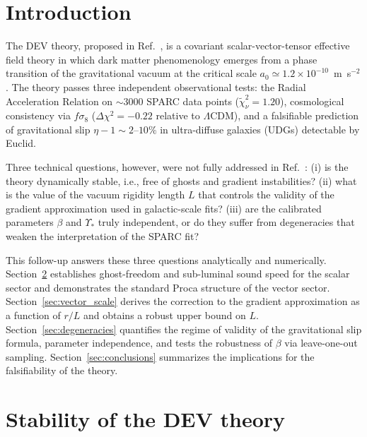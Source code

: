 \documentclass[aps,prd,reprint,floatfix,nofootinbib,superscriptaddress]{revtex4-2}
\newcommand{\aO}{a_0}
\begin{document}
\section{Introduction}

The DEV theory, proposed in Ref.~\cite{Mendes2026}, is a covariant
scalar-vector-tensor effective field theory in which dark matter
phenomenology emerges from a phase transition of the gravitational
vacuum at the critical scale $\aO\simeq 1.2\times10^{-10}$~m~s$^{-2}$.
The theory passes three independent observational tests:
the Radial Acceleration Relation on $\sim$3000 SPARC data points
($\widetilde{\chi}^2_\nu=1.20$), cosmological consistency via
$f\sigma_8$ ($\Delta\chi^2 = -0.22$ relative to $\Lambda$CDM), and a
falsifiable prediction of gravitational slip $\eta-1\sim 2\text{--}10\%$
in ultra-diffuse galaxies (UDGs) detectable by Euclid.

Three technical questions, however, were not fully addressed in
Ref.~\cite{Mendes2026}: (i) is the theory dynamically stable, i.e.,
free of ghosts and gradient instabilities? (ii) what is the value of
the vacuum rigidity length $L$ that controls the validity of the
gradient approximation used in galactic-scale fits? (iii) are the
calibrated parameters $\beta$ and $\Upsilon_*$ truly independent, or
do they suffer from degeneracies that weaken the interpretation of
the SPARC fit?

This follow-up answers these three questions analytically and
numerically. Section~\ref{sec:stability} establishes
ghost-freedom and sub-luminal sound speed for the scalar sector and
demonstrates the standard Proca structure of the vector sector.
Section~\ref{sec:vector_scale} derives the correction to the
gradient approximation as a function of $r/L$ and obtains a robust
upper bound on $L$. Section~\ref{sec:degeneracies} quantifies the
regime of validity of the gravitational slip formula, parameter
independence, and tests the robustness of $\beta$ via
leave-one-out sampling. Section~\ref{sec:conclusions} summarizes the
implications for the falsifiability of the theory.

\section{Stability of the DEV theory}
\label{sec:stability}
\end{document}
